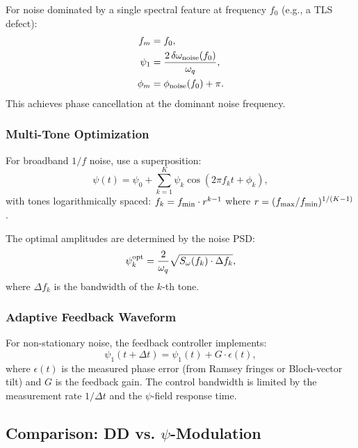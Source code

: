\documentclass[aps,prd,twocolumn,superscriptaddress,nofootinbib]{revtex4-2}
\begin{document}
For noise dominated by a single spectral feature at frequency $f_0$
(e.g., a TLS defect):
\begin{align}
f_m &= f_0, \\
\psi_1 &= \frac{2\,\delta\omega_{\rm noise}(f_0)}{\omega_q}, \\
\phi_m &= \phi_{\rm noise}(f_0) + \pi.
\end{align}
This achieves phase cancellation at the dominant noise frequency.

\subsubsection{Multi-Tone Optimization}

For broadband $1/f$ noise, use a superposition:
\begin{equation}
\psi(t) = \psi_0 + \sum_{k=1}^{K} \psi_k \cos(2\pi f_k t + \phi_k),
\end{equation}
with tones logarithmically spaced: $f_k = f_{\rm min}\cdot r^{k-1}$
where $r = (f_{\rm max}/f_{\rm min})^{1/(K-1)}$.

The optimal amplitudes are determined by the noise PSD:
\begin{equation}\label{eq:optimal-amp}
\psi_k^{\rm opt} = \frac{2}{\omega_q}\sqrt{S_\omega(f_k)\cdot\Delta f_k},
\end{equation}
where $\Delta f_k$ is the bandwidth of the $k$-th tone.

\subsubsection{Adaptive Feedback Waveform}

For non-stationary noise, the feedback controller implements:
\begin{equation}
\psi_1(t + \Delta t) = \psi_1(t) + G\cdot\epsilon(t),
\end{equation}
where $\epsilon(t)$ is the measured phase error (from Ramsey fringes or
Bloch-vector tilt) and $G$ is the feedback gain. The control bandwidth
is limited by the measurement rate $1/\Delta t$ and the $\psi$-field
response time.

\subsection{Comparison: DD vs. $\psi$-Modulation}
\end{document}
